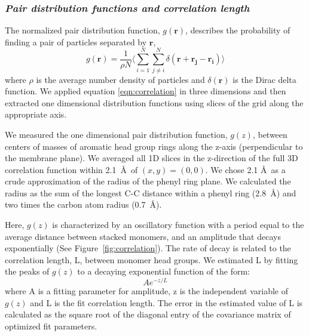 \documentclass[journal=jpcbfk,manusciprt=article]{achemso}
\begin{document}
  \subsubsection{\textit{Pair distribution functions and correlation length}}\label{section:correlation_length}

  The normalized pair distribution function, $g(\mathbf{r})$, describes
  the probability of finding a pair of particles separated by $\mathbf{r}$,
  \begin{equation}
	g(\mathbf{r})= \frac{1}{\rho N} \Bigg \langle \sum_{i=1}^{N}\sum_{j\neq i}^{N} \delta(\mathbf{r}+\mathbf{r_j}-\mathbf{r_i}) \Bigg \rangle
	\label{eqn:correlation}
  \end{equation}
  where $\rho$ is the average number density of particles and
  $\delta(\mathbf{r})$ is the Dirac delta function\cite{kuriabova_linear_2010}.
  We applied equation \ref{eqn:correlation} in three dimensions and then
  extracted one dimensional distribution functions using slices of the grid
  along the appropriate axis.

  We measured the one dimensional pair distribution function, $g(z)$, between centers 
  of masses of aromatic head group rings along the z-axis (perpendicular to
  the membrane plane). We averaged all 1D slices in the z-direction of the full 3D 
  correlation function within 2.1~\AA~of $(x, y)=(0, 0)$. We chose 2.1 \AA~as a crude 
  approximation of the radius of the phenyl ring plane. 
  We calculated the radius as the sum of the longest C-C distance within a phenyl 
  ring (2.8~\AA) and two times the carbon atom radius (0.7~\AA).
  
  Here, $g(z)$ is characterized by an oscillatory function with a period equal to the
  average distance between stacked monomers, and an amplitude that decays exponentially
  (See Figure~\ref{fig:correlation}). The rate of decay is related to the correlation 
  length, L, between monomer head groups. We estimated L by fitting the peaks of $g(z)$
  to a decaying exponential function of the form:
  \begin{equation}
  	Ae^{-z/L}
  	\label{eqn:decaying_exponential}
  \end{equation}
  where A is a fitting parameter for amplitude, z is the independent variable of $g(z)$ 
  and L is the fit correlation length. The error in the estimated value of L is 
  calculated as the square root of the diagonal entry of the covariance matrix of 
  optimized fit parameters.
  
\end{document}
